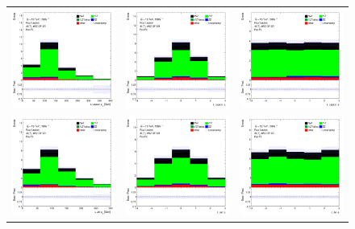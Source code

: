\begin{figure}[htbp]
\centering
  \begin{tabular}{ccc}


    \includegraphics[width=.25\textwidth]{figures/PreFitPlots/lep4_tWZ_4T_OF_L_lepton_pt.png} &
    \includegraphics[width=.25\textwidth]{figures/PreFitPlots/lep4_tWZ_4T_OF_L_lepton_eta.png} &
    \includegraphics[width=.25\textwidth]{figures/PreFitPlots/lep4_tWZ_4T_OF_L_lepton_phi.png} \\
    \includegraphics[width=.25\textwidth]{figures/PreFitPlots/lep4_tWZ_4T_OF_LJet_pt.png} &
    \includegraphics[width=.25\textwidth]{figures/PreFitPlots/lep4_tWZ_4T_OF_LJet_eta.png} &
    \includegraphics[width=.25\textwidth]{figures/PreFitPlots/lep4_tWZ_4T_OF_LJet_phi.png} \\


\end{tabular}
\end{figure}
